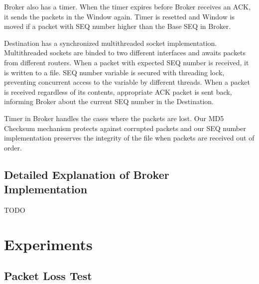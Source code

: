 \documentclass[conference]{IEEEtran}
\begin{document}
Broker also has a timer. When the timer expires before Broker receives an ACK, it sends the packets in the Window again. Timer is resetted and Window is moved if a packet with SEQ number higher than the Base SEQ in Broker.

Destination has a synchronized multithreaded socket implementation. Multithreaded sockets are binded to two different interfaces and awaits packets from different routers. When a packet with expected SEQ number is received, it is written to a file. SEQ number variable is secured with threading lock, preventing concurrent access to the variable by different threads. When a packet is received regardless of its contents, appropriate ACK packet is sent back, informing Broker about the current SEQ number in the Destination.

Timer in Broker handles the cases where the packets are lost. Our MD5 Checksum mechanism protects against corrupted packets and our SEQ number implementation preserves the integrity of the file when packets are received out of order.

\subsection{Detailed Explanation of Broker Implementation}

TODO

\section{Experiments}

\subsection{Packet Loss Test}\label{AA}
\end{document}
